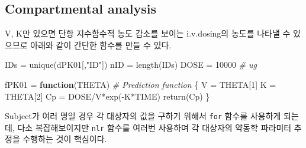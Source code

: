 \documentclass[
  11pt,
  krantz2, a4paper, twoside]{krantz}
\newenvironment{Shaded}{\begin{snugshade}}{\end{snugshade}}
\newcommand{\CommentTok}[1]{\textcolor[rgb]{0.56,0.35,0.01}{\textit{#1}}}
\newcommand{\ControlFlowTok}[1]{\textcolor[rgb]{0.13,0.29,0.53}{\textbf{#1}}}
\newcommand{\DecValTok}[1]{\textcolor[rgb]{0.00,0.00,0.81}{#1}}
\newcommand{\FunctionTok}[1]{\textcolor[rgb]{0.00,0.00,0.00}{#1}}
\newcommand{\NormalTok}[1]{#1}
\newcommand{\OtherTok}[1]{\textcolor[rgb]{0.56,0.35,0.01}{#1}}
\newcommand{\SpecialCharTok}[1]{\textcolor[rgb]{0.00,0.00,0.00}{#1}}
\newcommand{\StringTok}[1]{\textcolor[rgb]{0.31,0.60,0.02}{#1}}
\theoremstyle{definition}
\theoremstyle{definition}
\theoremstyle{definition}
\theoremstyle{definition}
\theoremstyle{remark}
\begin{document}
\hypertarget{compartmental-analysis}{%
\subsection{Compartmental analysis}\label{compartmental-analysis}}

V, K만 있으면 단항 지수함수적 농도 감소를 보이는 i.v.dosing의 농도를 나타낼 수 있으므로 아래와 같이 간단한 함수를 만들 수 있다.

\begin{Shaded}
\begin{Highlighting}[]
\NormalTok{IDs }\OtherTok{=} \FunctionTok{unique}\NormalTok{(dPK01[,}\StringTok{"ID"}\NormalTok{])}
\NormalTok{nID }\OtherTok{=} \FunctionTok{length}\NormalTok{(IDs)}
\NormalTok{DOSE }\OtherTok{=} \DecValTok{10000} \CommentTok{\# ug}

\NormalTok{fPK01 }\OtherTok{=} \ControlFlowTok{function}\NormalTok{(THETA) }\CommentTok{\# Prediction function}
\NormalTok{\{}
\NormalTok{  V  }\OtherTok{=}\NormalTok{ THETA[}\DecValTok{1}\NormalTok{]}
\NormalTok{  K  }\OtherTok{=}\NormalTok{ THETA[}\DecValTok{2}\NormalTok{]}
\NormalTok{  Cp }\OtherTok{=}\NormalTok{ DOSE}\SpecialCharTok{/}\NormalTok{V}\SpecialCharTok{*}\FunctionTok{exp}\NormalTok{(}\SpecialCharTok{{-}}\NormalTok{K}\SpecialCharTok{*}\NormalTok{TIME)  }
  \FunctionTok{return}\NormalTok{(Cp)}
\NormalTok{\}}
\end{Highlighting}
\end{Shaded}

Subject가 여러 명일 경우 각 대상자의 값을 구하기 위해서 \texttt{for} 함수를 사용하게 되는데, 다소 복잡해보이지만 \texttt{nlr} 함수를 여러번 사용하며 각 대상자의 약동학 파라미터 추정을 수행하는 것이 핵심이다.
\end{document}
